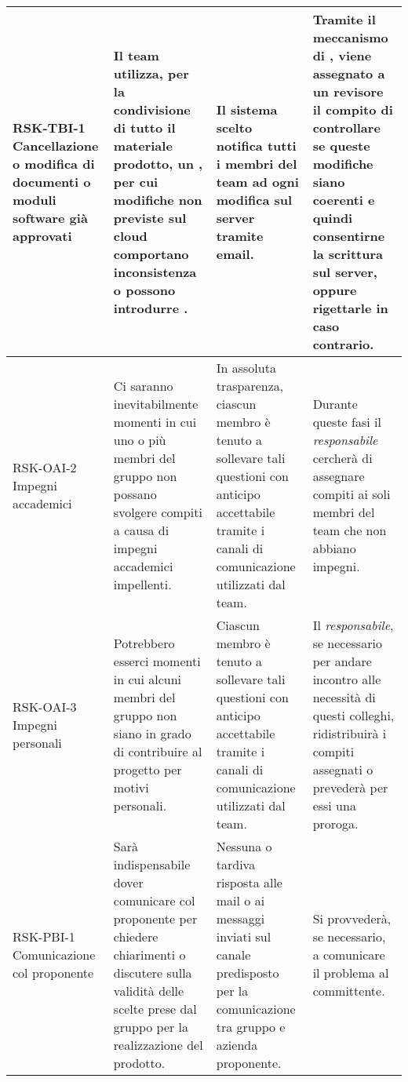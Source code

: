 \begin{center}
\begin{longtable}{|p{3cm}|p{4cm}|p{3.5cm}|p{3.5cm}|}
		RSK-TBI-1 \newline Cancellazione o modifica di documenti o moduli software già approvati & 
		Il team utilizza, per la condivisione di tutto il materiale prodotto, un \glock{vcs}, per cui modifiche non previste sul cloud comportano inconsistenza o possono introdurre \glock{regressioni}.
		&  
		Il sistema \glock{vcs} scelto notifica tutti i membri del team ad ogni modifica sul server tramite email.   
		& 
		Tramite il meccanismo di \glock{pull request}, viene assegnato a un revisore il compito di controllare se queste modifiche siano coerenti e quindi consentirne la scrittura sul server, oppure rigettarle in caso contrario.   \\
		\hline
		
		RSK-OAI-2 \newline Impegni accademici & 
		Ci saranno inevitabilmente momenti in cui uno o più membri del gruppo non possano svolgere compiti a causa di impegni accademici impellenti.
		&  In assoluta trasparenza, ciascun membro è tenuto a sollevare tali questioni con anticipo accettabile tramite i canali di comunicazione utilizzati dal team.
		 
		& Durante queste fasi il \textit{responsabile} cercherà di assegnare compiti ai soli membri del team che non abbiano impegni. \\
		\hline
		
		RSK-OAI-3 \newline Impegni personali & 
		Potrebbero esserci momenti in cui alcuni membri del gruppo non siano in grado di contribuire al progetto per motivi personali.
		&  Ciascun membro è tenuto a sollevare tali questioni con anticipo accettabile tramite i canali di comunicazione utilizzati dal team.
		& Il \textit{responsabile}, se necessario per andare incontro alle necessità di questi colleghi, ridistribuirà i compiti assegnati o prevederà per essi una proroga. \\
		\hline
		
		RSK-PBI-1 \newline Comunicazione col proponente
		& 
		Sarà indispensabile dover comunicare col proponente per chiedere chiarimenti o discutere sulla validità delle scelte prese dal gruppo per la realizzazione del prodotto.
		&  
		Nessuna o tardiva risposta alle mail o ai messaggi inviati sul canale \glock{Slack} predisposto per la comunicazione tra gruppo e azienda proponente.
		& 
		Si provvederà, se necessario, a comunicare il problema al committente.  \\
		\hline


\end{longtable}
\end{center}
